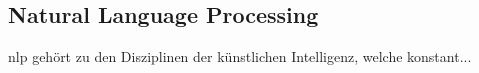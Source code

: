 \subsection{Natural Language Processing}

\gls{nlp} gehört zu den Disziplinen der künstlichen Intelligenz, welche konstant...
